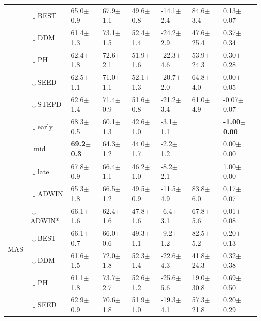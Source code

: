 \begin{tabular}{llllllll}
 & $\downarrow$BEST & 65.0\tiny{$\pm$0.9} & 67.9\tiny{$\pm$1.1} & 49.6\tiny{$\pm$0.8} & -14.1\tiny{$\pm$2.4} & 84.6\tiny{$\pm$3.4} & 0.13\tiny{$\pm$0.07} \\
 & $\downarrow$DDM & 61.4\tiny{$\pm$1.3} & 73.1\tiny{$\pm$1.5} & 52.4\tiny{$\pm$1.4} & -24.2\tiny{$\pm$2.9} & 47.6\tiny{$\pm$25.4} & 0.37\tiny{$\pm$0.34} \\
 & $\downarrow$PH & 62.4\tiny{$\pm$1.8} & 72.6\tiny{$\pm$2.1} & 51.9\tiny{$\pm$1.6} & -22.3\tiny{$\pm$4.6} & 53.9\tiny{$\pm$24.3} & 0.30\tiny{$\pm$0.28} \\
 & $\downarrow$SEED & 62.5\tiny{$\pm$1.1} & 71.0\tiny{$\pm$1.1} & 52.1\tiny{$\pm$1.3} & -20.7\tiny{$\pm$2.0} & 64.8\tiny{$\pm$4.0} & 0.00\tiny{$\pm$0.05} \\
 & $\downarrow$STEPD & 62.6\tiny{$\pm$1.4} & 71.4\tiny{$\pm$0.9} & 51.6\tiny{$\pm$0.8} & -21.2\tiny{$\pm$3.4} & 61.0\tiny{$\pm$4.9} & -0.07\tiny{$\pm$0.07} \\
 & $\downarrow$early & 68.3\tiny{$\pm$0.5} & 60.1\tiny{$\pm$1.3} & 42.6\tiny{$\pm$1.0} & -3.1\tiny{$\pm$1.1} &  & \textbf{-1.00\tiny{$\pm$0.00}} \\
 & $\ \;$mid & \textbf{69.2\tiny{$\pm$0.3}} & 64.3\tiny{$\pm$1.2} & 44.0\tiny{$\pm$1.7} & -2.2\tiny{$\pm$1.2} &  & 0.00\tiny{$\pm$0.00} \\
 & $\downarrow$late & 67.8\tiny{$\pm$0.9} & 66.4\tiny{$\pm$1.1} & 46.2\tiny{$\pm$1.0} & -8.2\tiny{$\pm$2.1} &  & 1.00\tiny{$\pm$0.00} \\
\midrule
\multirow[t]{10}{*}{MAS} & $\downarrow$ADWIN & 65.3\tiny{$\pm$1.8} & 66.5\tiny{$\pm$1.2} & 49.5\tiny{$\pm$0.9} & -11.5\tiny{$\pm$4.9} & 83.8\tiny{$\pm$6.0} & 0.17\tiny{$\pm$0.07} \\
 & $\downarrow$ADWIN* & 66.1\tiny{$\pm$1.6} & 62.4\tiny{$\pm$1.6} & 47.8\tiny{$\pm$1.6} & -6.4\tiny{$\pm$3.1} & 67.8\tiny{$\pm$5.6} & 0.01\tiny{$\pm$0.08} \\
 & $\downarrow$BEST & 66.1\tiny{$\pm$0.7} & 66.0\tiny{$\pm$0.6} & 49.3\tiny{$\pm$1.1} & -9.2\tiny{$\pm$1.2} & 82.5\tiny{$\pm$5.2} & 0.20\tiny{$\pm$0.13} \\
 & $\downarrow$DDM & 61.6\tiny{$\pm$1.5} & 72.0\tiny{$\pm$1.8} & 52.3\tiny{$\pm$1.4} & -22.6\tiny{$\pm$4.3} & 41.8\tiny{$\pm$24.3} & 0.32\tiny{$\pm$0.38} \\
 & $\downarrow$PH & 61.1\tiny{$\pm$1.8} & 73.7\tiny{$\pm$2.7} & 52.6\tiny{$\pm$1.2} & -25.6\tiny{$\pm$5.6} & 19.0\tiny{$\pm$30.8} & 0.69\tiny{$\pm$0.50} \\
 & $\downarrow$SEED & 62.9\tiny{$\pm$0.9} & 70.6\tiny{$\pm$1.8} & 51.9\tiny{$\pm$1.0} & -19.3\tiny{$\pm$4.1} & 57.3\tiny{$\pm$21.8} & 0.20\tiny{$\pm$0.29} \\

\end{tabular}
